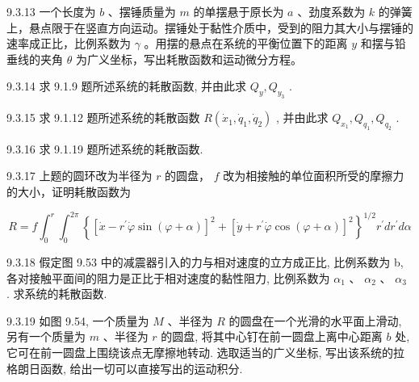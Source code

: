 \begin{problem}{9.3.13}
一个长度为 $b$ 、摆锤质量为 $m$ 的单摆悬于原长为 $a$ 、劲度系数为 $k$ 的弹簧上，悬点限于在竖直方向运动。摆锤处于黏性介质中，受到的阻力其大小与摆锤的速率成正比，比例系数为 $\gamma$ 。用摆的悬点在系统的平衡位置下的距离 $y$ 和摆与铅垂线的夹角 $\theta$ 为广义坐标，写出耗散函数和运动微分方程。
\begin{center}

\end{center}
\end{problem}
\clearpage


\begin{problem}{9.3.14}
求 9.1.9 题所述系统的耗散函数, 并由此求 $Q_{y}, Q_{y_{3}}$ .
\end{problem}
\clearpage


\begin{problem}{9.3.15}
求 9.1.12 题所述系统的耗散函数 $R(\dot{x}_1, \dot{q}_1, \dot{q}_2)$ , 并由此求 $Q_{x_1}, Q_{q_1}, Q_{q_2}$ .
\end{problem}
\clearpage


\begin{problem}{9.3.16}
求 9.1.19 题所述系统的耗散函数.
\end{problem}
\clearpage


\begin{problem}{9.3.17}
上题的圆环改为半径为 $r$ 的圆盘， $f$ 改为相接触的单位面积所受的摩擦力的大小，证明耗散函数为

\[
R = f \int_ {0} ^ {r} \int_ {0} ^ {2 \pi} \left\{\left[ \dot {x} - r ^ {\prime} \dot {\varphi} \sin (\varphi + \alpha) \right] ^ {2} + \left[ \dot {y} + r ^ {\prime} \dot {\varphi} \cos (\varphi + \alpha) \right] ^ {2} \right\} ^ {1 / 2} r ^ {\prime} d r ^ {\prime} d \alpha
\]
\end{problem}
\clearpage


\begin{problem}{9.3.18}
假定图 9.53 中的减震器引入的力与相对速度的立方成正比, 比例系数为 b, 各对接触平面间的阻力是正比于相对速度的黏性阻力, 比例系数为 $\alpha_{1}$ 、 $\alpha_{2}$ 、 $\alpha_{3}$ . 求系统的耗散函数.
\begin{center}

\end{center}
\end{problem}
\clearpage


\begin{problem}{9.3.19}
如图 9.54, 一个质量为 $M$ 、半径为 $R$ 的圆盘在一个光滑的水平面上滑动, 另有一个质量为 $m$ 、半径为 $r$ 的圆盘, 将其中心钉在前一圆盘上离中心距离 $b$ 处, 它可在前一圆盘上围绕该点无摩擦地转动. 选取适当的广义坐标, 写出该系统的拉格朗日函数, 给出一切可以直接写出的运动积分.
\begin{center}

\end{center}
\end{problem}
\clearpage


